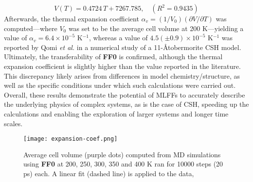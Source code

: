 \begin{equation}
    \label{eq:thermal-expansion}
    V(T) = 0.4724\,T + 7267.785, \quad (R^2 = 0.9435)
\end{equation}
Afterwards, the thermal expansion coefficient $\alpha_v=(1/V_0)(\partial V/\partial T)$ was computed---where $V_0$ 
was set to be the average cell volume at 200 K---yielding a value of $\alpha_v = 6.4 \times 10^{-5}$ K$^{-1}$, whereas a value of $4.5(\pm 0.9) \times 10^{-5}$ K$^{-1}$ was reported by Qomi \emph{et al.}\supercite{AbdolhosseiniQomi2015} in a numerical study of a 11-\AA tobermorite CSH model. 
Ultimately, the transferability of \textbf{FF0} is confirmed, although the thermal expansion coefficient is slightly higher than the value reported in the literature. This discrepancy likely arises from differences in model chemistry/structure, as well as the specific conditions under which such calculations were carried out. Overall, these results demonstrate the potential of MLFFs to accurately describe the underlying physics of complex systems, as is the case of CSH, speeding up the calculations and enabling the exploration of larger systems and longer time scales.
\begin{figure}[H]
    \centering
    \texttt{[image: expansion-coef.png]}
    \caption{
    Average cell volume (purple dots) computed from MD simulations using \textbf{FF0} at 200, 250, 300, 350 and 400 K ran for 10000 steps (20 ps) each. A linear fit (dashed line) is applied to the data, 
    }
    \label{expansion-coef}
\end{figure}





